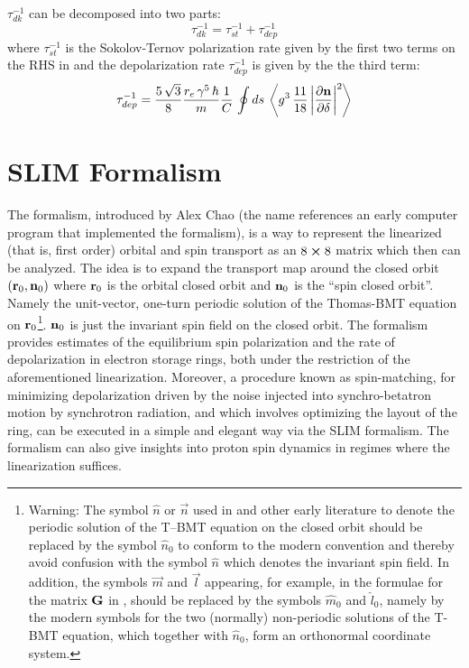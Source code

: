 {$\tau_{dk}^{-1}$ can be decomposed into two parts:
\begin{equation}
  \tau_{dk}^{-1} = \tau_{st}^{-1} + \tau_{dep}^{-1}
  \label{tdk}
\end{equation}
where $\tau_{st}^{-1}$ is the Sokolov-Ternov polarization rate given by the first two terms on the
RHS in  and the depolarization rate $\tau_{dep}^{-1}$ is given by the the third term:
\begin{equation}
  \tau_{dep}^{-1} = \frac{5 \, \sqrt{3}}{8} \frac{r_e \, \gamma^5 \, \hbar}{m}
  \frac{1}{C} \, \oint ds \, \left< g^3 \,
  \frac{11}{18} \left| \frac{\partial {\bf n}}{\partial \delta} \right|^2 \right>
  \label{tdep}
\end{equation}

\section{SLIM Formalism}
\label{s:slim}

The  formalism\cite{b:chao.spin,b:barber99}, introduced by Alex Chao (the name references
an early computer program that implemented the formalism), is a way to represent the linearized
(that is, first order) orbital and spin transport as an $8 \mathbin{\boldsymbol{\times}} 8$ matrix which then can be
analyzed. The idea is to expand the transport map around the closed orbit $({\bf r}_0, {\bf n}_0)$ where
${\bf r}_0$ is the orbital closed orbit and ${\bf n}_0$ is the ``spin closed orbit''. Namely the unit-vector,
one-turn periodic solution of the Thomas-BMT equation on 
%
${\bf r}_0$\footnote{Warning: The symbol $\hat n$ or
$\vec n$ used in \cite{b:chao.spin,b:barber85} and other early literature to denote the periodic
solution of the T--BMT equation on the closed orbit should be replaced by the symbol $\hat n_0$ to
conform to the modern convention \cite{b:barber99} and thereby avoid confusion with the symbol $\hat
n$ which denotes the invariant spin field.  In addition, the symbols $\vec m$ and $\vec l$
appearing, for example, in the formulae for the matrix ${\bf G}$ in \cite{b:barber85}, should be
replaced by the symbols $\hat m_0$ and $\hat l_0$, namely by the modern symbols for the two
(normally) non-periodic solutions of the T-BMT equation, which together with $\hat n_0$, form an
orthonormal coordinate system.}.
% 
${\bf n}_0$ is just the invariant spin field on the closed orbit. The formalism provides estimates of
the equilibrium spin polarization and the rate of depolarization in electron storage rings, both
under the restriction of the aforementioned linearization. Moreover, a procedure known as
spin-matching, for minimizing depolarization driven by the noise injected into synchro-betatron
motion by synchrotron radiation, and which involves optimizing the layout of the ring, can be
executed in a simple and elegant way via the SLIM formalism. The formalism can also give insights
into proton spin dynamics in regimes where the linearization suffices.

}
